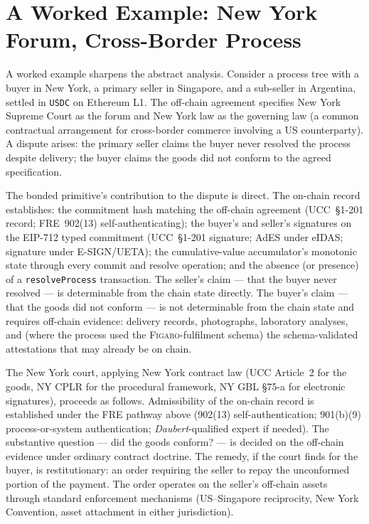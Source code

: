 \documentclass[11pt,a4paper]{article}
\theoremstyle{remark}
\newcommand{\figaro}{\textsc{Figaro}}
\begin{document}
\section{A Worked Example: New York Forum, Cross-Border Process}
\label{sec:ny-worked-example}

A worked example sharpens the abstract analysis. Consider a
process tree with a buyer in New York, a primary seller in
Singapore, and a sub-seller in Argentina, settled in
\texttt{USDC} on Ethereum L1. The off-chain agreement specifies
New York Supreme Court as the forum and New York law as the
governing law (a common contractual arrangement for
cross-border commerce involving a US counterparty). A dispute
arises: the primary seller claims the buyer never resolved the
process despite delivery; the buyer claims the goods did not
conform to the agreed specification.

The bonded primitive's contribution to the dispute is direct.
The on-chain record establishes: the commitment hash matching
the off-chain agreement (UCC~§1-201 record; FRE~902(13)
self-authenticating); the buyer's and seller's signatures on the
EIP-712 typed commitment (UCC~§1-201 signature; AdES under
eIDAS; signature under E-SIGN/UETA); the cumulative-value
accumulator's monotonic state through every commit and resolve
operation; and the absence (or presence) of a
\texttt{resolveProcess} transaction. The seller's claim --- that
the buyer never resolved --- is determinable from the chain
state directly. The buyer's claim --- that the goods did not
conform --- is not determinable from the chain state and
requires off-chain evidence: delivery records, photographs,
laboratory analyses, and (where the process used the
\figaro{}-fulfilment schema) the schema-validated attestations
that may already be on chain.

The New York court, applying New York contract law (UCC
Article~2 for the goods, NY CPLR for the procedural framework,
NY GBL §75-a for electronic signatures), proceeds as follows.
Admissibility of the on-chain record is established under the
FRE pathway above (902(13) self-authentication; 901(b)(9)
process-or-system authentication; \emph{Daubert}-qualified
expert if needed). The substantive question --- did the goods
conform? --- is decided on the off-chain evidence under
ordinary contract doctrine. The remedy, if the court finds for
the buyer, is restitutionary: an order requiring the seller to
repay the unconformed portion of the payment. The order operates
on the seller's off-chain assets through standard enforcement
mechanisms (US--Singapore reciprocity, New York Convention, asset
attachment in either jurisdiction).
\end{document}
